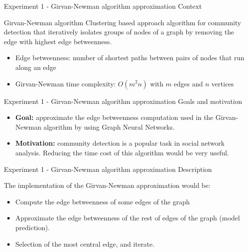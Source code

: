 \documentclass[xcolor=table]{beamer}
\begin{document}
\begin{frame}{Experiment 1 - Girvan-Newman algorithm approximation }{ Context}

\begin{block}{Girvan-Newman algorithm}{
        Clustering based approach algorithm for community detection that iteratively isolates groups of nodes of a graph by removing the edge with highest edge betweenness.
    }\end{block}


\begin{itemize}
    \item Edge betweenness: number of shortest paths between pairs of nodes that run along an edge
    \item Girvan-Newman time complexity: $O(m^{2}n)$ with $m$ edges and $n$ vertices
\end{itemize}


\end{frame}



\begin{frame}{Experiment 1 - Girvan-Newman algorithm approximation }{ Goals and motivation}

\begin{itemize}
    \item \textbf{Goal:} approximate the edge betweenness computation used in the Girvan-Newman algorithm by using Graph Neural Networks. 
    \item \textbf{Motivation:} community detection is a popular task in social network analysis. Reducing the time cost of this algorithm would be very useful.
\end{itemize}


\end{frame}



\begin{frame}{Experiment 1 - Girvan-Newman algorithm approximation }{ Description}


The implementation of the Girvan-Newman approximation would be:
\begin{itemize}
    \item Compute the edge betweenness of some edges of the graph
    \item Approximate the edge betweenness of the rest of edges of the graph (model prediction).
    \item Selection of the most central edge, and iterate.
\end{itemize}

\end{frame}
\end{document}
